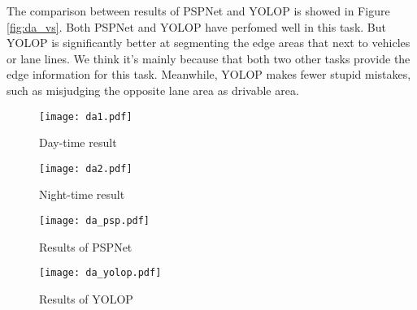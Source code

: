 \documentclass[10pt,twocolumn,letterpaper]{article}
\begin{document}
The comparison between results of PSPNet and YOLOP is showed in Figure \ref{fig:da_vs}. Both PSPNet and YOLOP have perfomed well in this task. But YOLOP is significantly better at segmenting the edge areas that next to vehicles or lane lines. We think it's mainly because that both two other tasks provide the edge information for this task. Meanwhile, YOLOP makes fewer stupid mistakes, such as misjudging the opposite lane area as drivable area.

\begin{table}
\begin{center}
\end{center}
\caption{Drivable Area Segmentation Results: Comparing the proposed YOLOP with state-of-the-art drivable area segmentation or semantic segmentation methods.}
\label{table:da_result}
\end{table}

\begin{figure*}
\centering
\begin{subfigure}{\linewidth}
  \texttt{[image: da1.pdf]}
  \caption{Day-time result}
\end{subfigure}

\begin{subfigure}{\linewidth}
  \texttt{[image: da2.pdf]}
  \caption{Night-time result}
\end{subfigure}
   \caption{Visualization of the drivable area segmentation results of YOLOP. Top Row: Drivable area segmentation results in day-time scenes. Bottom row: Drivable area segmentation results in night scenes.}
\label{fig:da}
\end{figure*}

\begin{figure*}
\centering
\begin{subfigure}{\linewidth}
  \texttt{[image: da\_psp.pdf]}
  \caption{Results of PSPNet}
\end{subfigure}

\begin{subfigure}{\linewidth}
  \texttt{[image: da\_yolop.pdf]}
  \caption{Results of YOLOP}
\end{subfigure}
\caption{Comparison between the drivable area segmentation results of PSPNet and YOLOP. Top Row: Drivable area segmentation results of PSPNet. Bottom row: Drivable area segmentation results of YOLOP. The yellow ellipses are the false negative. The red  ellipses indicate the false positive.}
\label{fig:da_vs}
\end{figure*}
\end{document}
